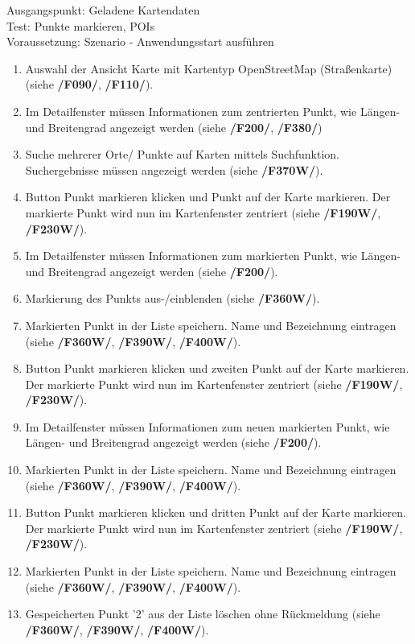 \documentclass[10pt]{scrreprt}
\begin{document}
\vspace{1.0cm}
Ausgangspunkt: Geladene Kartendaten \\
Test: Punkte markieren, POIs \\
Voraussetzung: Szenario - Anwendungsstart ausführen
\begin{enumerate}[leftmargin = 2.5cm, resume]
\item Auswahl der Ansicht Karte mit Kartentyp OpenStreetMap (Straßenkarte) (siehe \textbf{/F090/}, \textbf{/F110/}).
\item Im Detailfenster müssen Informationen zum zentrierten Punkt, wie Längen- und Breitengrad angezeigt werden (siehe \textbf{/F200/}, \textbf{/F380/})
\wunsch
\item Suche mehrerer Orte/ Punkte auf Karten mittels Suchfunktion. Suchergebnisse müssen angezeigt werden (siehe \textbf{/F370W/}).
\item Button Punkt markieren klicken und Punkt auf der Karte markieren. Der markierte Punkt wird nun im Kartenfenster zentriert (siehe \textbf{/F190W/}, \textbf{/F230W/}).
\item Im Detailfenster müssen Informationen zum markierten Punkt, wie Längen- und Breitengrad angezeigt werden (siehe \textbf{/F200/}).
\item Markierung des Punkts aus-/einblenden (siehe \textbf{/F360W/}).
\item Markierten Punkt in der Liste speichern. Name und Bezeichnung eintragen (siehe \textbf{/F360W/}, \textbf{/F390W/}, \textbf{/F400W/}).
\item Button Punkt markieren klicken und zweiten Punkt auf der Karte markieren. Der markierte Punkt wird nun im Kartenfenster zentriert (siehe \textbf{/F190W/}, \textbf{/F230W/}).
\item Im Detailfenster müssen Informationen zum neuen markierten Punkt, wie Längen- und Breitengrad angezeigt werden (siehe \textbf{/F200/}).
\item Markierten Punkt in der Liste speichern. Name und Bezeichnung eintragen (siehe \textbf{/F360W/}, \textbf{/F390W/}, \textbf{/F400W/}).
\item Button Punkt markieren klicken und dritten Punkt auf der Karte markieren. Der markierte Punkt wird nun im Kartenfenster zentriert (siehe \textbf{/F190W/}, \textbf{/F230W/}).
\item Markierten Punkt in der Liste speichern. Name und Bezeichnung eintragen (siehe \textbf{/F360W/}, \textbf{/F390W/}, \textbf{/F400W/}).
\item Gespeicherten Punkt '2' aus der Liste löschen ohne Rückmeldung (siehe \textbf{/F360W/}, \textbf{/F390W/}, \textbf{/F400W/}).

\end{enumerate}
\end{document}
